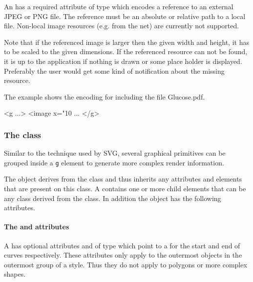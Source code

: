 An \Image has a required attribute  of type
 which encodes a reference to an external JPEG or PNG file. The reference must be an absolute or relative path to a local file.
Non-local image resources (e.g. from the net) are currently not supported.


Note that if the referenced image is larger then the given 
width and height, it has to be scaled to the given dimensions.
If the referenced resource can not be found, it is up to the application if nothing is drawn or some place holder is displayed.
Preferably the user would get some kind of notification about the missing resource.

The example shows the encoding for including the file Glucose.pdf.
{
\footnotesize
\begin{example}
 <g ...>
  <image x="10%
      ...
</g> 
\end{example}
}


\subsubsection{The  class}
\label{rendergroup-class}

Similar to the technique used by SVG, several graphical primitives can be grouped inside a \texttt{g} 
element to generate more complex render information.



The \RenderGroup object derives from the \GraphicalPrimitiveTwoD class
and thus inherits any attributes and elements that are present on this
class.
A \RenderGroup contains one or more child elements that can be any class derived from the \TransformationTwoD class.
In addition the \RenderGroup object has the following attributes.

\paragraph{The \fixttspace{} and \fixttspace{} attributes}

A \RenderGroup has optional attributes  and  of type
 which point to a \LineEnding for the start and end of curves respectively. 
These attributes only apply to the outermost \RenderCurve objects in the outermost group of a style. 
Thus they do not apply to polygons or more complex shapes. 

